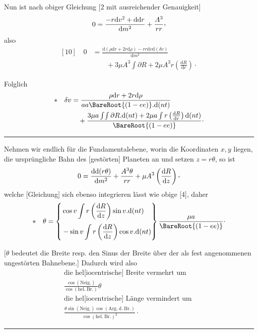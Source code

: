 \par
\noindent\hspace*{\parindent}Nun ist nach obiger Gleichung [2 mit ausreichender Genauigkeit]
\[
0=\frac{-r\mathrm{d}v^{2}+\mathrm{d}\mathrm{d}r}{\mathrm{d}m^{2}}+\frac{A^{3}}{rr}\mathpunct{\text{\raisebox{.45ex}{,}}}
\]
also
\[
\begin{aligned}
[10]\quad 0&=\frac{\mathrm{d}(\rho\mathrm{d}r+2r\mathrm{d}\rho)-rr\mathrm{d}v\mathrm{d}(\delta v)}{\mathrm{d}m^{2}}\\
&\qquad+3\mu A^{3}\int\partial R+2\mu A^{3}r\left(\frac{\mathrm{d}R}{\mathrm{d}r}\right)\mathpunct{\cdot}
\end{aligned}
\]
\par
\noindent\hspace*{\parindent}Folglich
\[
\begin{aligned}
*\quad\delta v&=\frac{\rho\mathrm{d}r+2r\mathrm{d}\rho}{aa\BareRoot{(1-ee)}\mathord{.}\mathrm{d}(nt)}\\
&\quad+\frac{3\mu a\int\!\int\partial R\mathord{.}\mathrm{d}(nt)+2\mu a\int r\left(\frac{\mathrm{d}R}{\mathrm{d}r}\right)\mathrm{d}(nt)}{\BareRoot{(1-ee)}}\mathpunct{\cdot}
\end{aligned}
\]
\par\medskip
\begin{center}\rule{.27\linewidth}{.4pt}\end{center}
\par
\noindent\hspace*{\parindent}Nehmen wir endlich für die Fundamentalebene, worin die Koordinaten \(x,y\) liegen, die ursprüngliche Bahn des [gestörten] Planeten an und setzen \(z=r\theta\), so ist
\[
0=\frac{\mathrm{d}\mathrm{d}(r\theta)}{\mathrm{d}m^{2}}+\frac{A^{3}\theta}{rr}+\mu A^{3}\left(\frac{\mathrm{d}R}{\mathrm{d}z}\right)\mathpunct{\text{\raisebox{.45ex}{,}}}
\]
welche [Gleichung] sich ebenso integrieren lässt wie obige [4], daher
\[
*\quad\theta=\left\{\begin{aligned}&\cos v\int r\left(\frac{\mathrm{d}R}{\mathrm{d}z}\right)\sin v\mathord{.}\mathrm{d}(nt)\\[2pt]&-\sin v\int r\left(\frac{\mathrm{d}R}{\mathrm{d}z}\right)\cos v\mathord{.}\mathrm{d}(nt)\end{aligned}\right\}\frac{\mu a}{\BareRoot{(1-ee)}}\mathpunct{\cdot}
\]
\par
\noindent\hspace*{\parindent}[\(\theta\) bedeutet die Breite resp. den Sinus der Breite über der als fest angenommenen ungestörten Bahnebene.] Dadurch wird also
\[
\begin{gathered}
\text{die hel[iocentrische] Breite vermehrt um }\\[2pt]
\frac{\cos(\mathrm{Neig.})}{\cos(\mathrm{hel.\ Br.})}\theta\\[6pt]
\text{die hel[iocentrische] Länge vermindert um }\\[2pt]
\frac{\theta\sin(\mathrm{Neig.})\cos(\mathrm{Arg.\ d.\ Br.})}{\cos(\mathrm{hel.\ Br.})^{2}}\mathpunct{\cdot}
\end{gathered}
\]
\par\medskip
\begin{center}\rule{.27\linewidth}{.4pt}\end{center}

